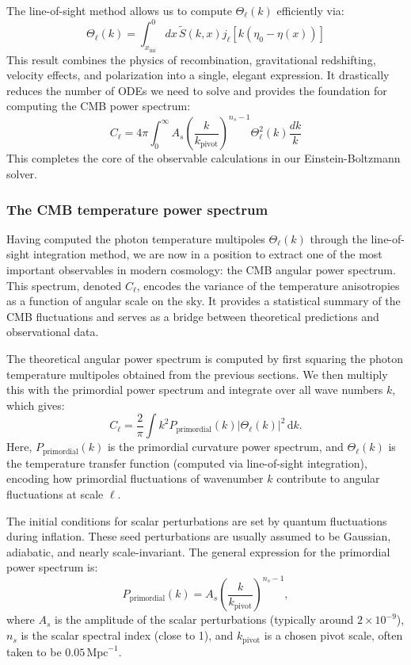 \documentclass{aa}
\numberwithin{equation}{section}
\numberwithin{table}{section}
\numberwithin{figure}{section}
\begin{document}
The line-of-sight method allows us to compute $\Theta_\ell(k)$ efficiently via:
\begin{equation}
\Theta_\ell(k) = \int_{x_{\text{ini}}}^{0} dx\, \tilde{S}(k, x) j_\ell[k(\eta_0 - \eta(x))]
\end{equation}
This result combines the physics of recombination, gravitational redshifting, velocity effects, and polarization into a single, elegant expression. It drastically reduces the number of ODEs we need to solve and provides the foundation for computing the CMB power spectrum:
\begin{equation}
C_\ell = 4\pi \int_0^\infty A_s \left( \frac{k}{k_\text{pivot}} \right)^{n_s - 1} \Theta_\ell^2(k) \frac{dk}{k}
\end{equation}
This completes the core of the observable calculations in our Einstein-Boltzmann solver.
\color{black}




\subsubsection{The CMB temperature power spectrum}
\color{Plum}
Having computed the photon temperature multipoles $\Theta_\ell(k)$ through the line-of-sight integration method, we are now in a position to extract one of the most important observables in modern cosmology: the CMB angular power spectrum. This spectrum, denoted $C_\ell$, encodes the variance of the temperature anisotropies as a function of angular scale on the sky. It provides a statistical summary of the CMB fluctuations and serves as a bridge between theoretical predictions and observational data.

The theoretical angular power spectrum is computed by first squaring the photon temperature multipoles obtained from the previous sections. We then multiply this with the primordial power spectrum and integrate over all wave numbers $k$, which gives:
\begin{equation}
    C_\ell = \frac{2}{\pi} \int k^2 P_{\text{primordial}}(k) \left| \Theta_\ell(k) \right|^2 \, \mathrm{d}k.
\end{equation}
Here, $P_{\text{primordial}}(k)$ is the primordial curvature power spectrum, and $\Theta_\ell(k)$ is the temperature transfer function (computed via line-of-sight integration), encoding how primordial fluctuations of wavenumber $k$ contribute to angular fluctuations at scale $\ell$.

The initial conditions for scalar perturbations are set by quantum fluctuations during inflation. These seed perturbations are usually assumed to be Gaussian, adiabatic, and nearly scale-invariant. The general expression for the primordial power spectrum is:
\begin{equation}
    P_{\text{primordial}}(k) = A_s \left( \frac{k}{k_{\text{pivot}}} \right)^{n_s - 1},
\end{equation}
where $A_s$ is the amplitude of the scalar perturbations (typically around $2 \times 10^{-9}$), $n_s$ is the scalar spectral index (close to 1), and $k_{\text{pivot}}$ is a chosen pivot scale, often taken to be $0.05\,\text{Mpc}^{-1}$.
\end{document}
